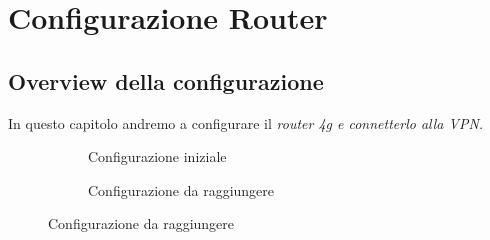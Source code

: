 
\chapter{Configurazione Router}

\section{Overview della configurazione}

In questo capitolo andremo a configurare il \it{router 4g} e connetterlo alla VPN.


\newsavebox{\myimagea}
\begin{figure}[H]
    \centering%
    \begin{subfigure}{0.4\textwidth}
        \centering
        \usebox{\myimagea}
        \caption{Configurazione iniziale}
        \label{fig:diag-router}
    \end{subfigure}
    \hfill%
    \begin{subfigure}{0.5\textwidth}
        \centering
        \caption{Configurazione da raggiungere}
        \label{fig:diag-router1}
    \end{subfigure}
\end{figure}


